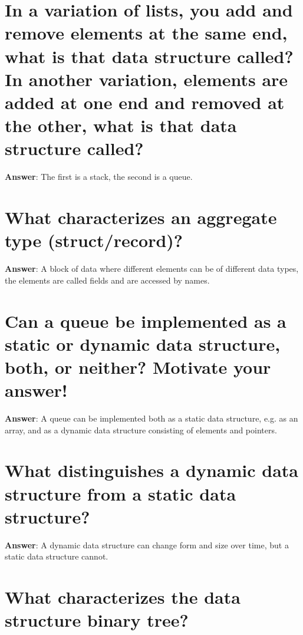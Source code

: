 \documentclass[a4paper,11pt,oneside]{book}
\begin{document}
\begin{sloppypar}
\section{In a variation of lists, you add and remove elements at the same end, what is that data structure called? In another variation, elements are added at one end and removed at the other, what is that data structure called?}

\label{q:266:sa:en:True}

\textbf{Answer}: The first is a stack, the second is a queue.



\section{What characterizes an aggregate type (struct/record)?}

\label{q:267:sa:en:True}

\textbf{Answer}: A block of data where different elements can be of different data types, the elements are called fields and are accessed by names.



\section{Can a queue be implemented as a static or dynamic data structure, both, or neither? Motivate your answer!}

\label{q:268:sa:en:True}

\textbf{Answer}: A queue can be implemented both as a static data structure, e.g. as an array, and as a dynamic data structure consisting of elements and pointers.



\section{What distinguishes a dynamic data structure from a static data structure?}

\label{q:269:sa:en:True}

\textbf{Answer}: A dynamic data structure can change form and size over time, but a static data structure cannot.



\section{What characterizes the data structure binary tree?}


\end{sloppypar}
\end{document}
